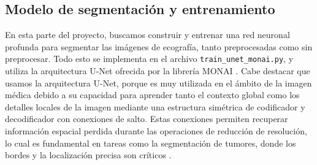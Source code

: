 \documentclass[12pt]{article}
\begin{document}
\subsection{Modelo de segmentación y entrenamiento}
\label{sec:entrenamiento}
En esta parte del proyecto, buscamos construir y entrenar una red neuronal profunda para segmentar las imágenes de ecografía, tanto preprocesadas como sin preprocesar. Todo esto se implementa en el archivo \texttt{train\_unet\_monai.py}, y utiliza la arquitectura U-Net ofrecida por la librería MONAI \cite{monai_unet}.
Cabe destacar que usamos la arquitectura U-Net, porque es muy utilizada en el ámbito de la imagen médica debido a su capacidad para aprender tanto el contexto global como los detalles locales de la imagen mediante una estructura simétrica de codificador y decodificador con conexiones de salto. Estas conexiones permiten recuperar información espacial perdida durante las operaciones de reducción de resolución, lo cual es fundamental en tareas como la segmentación de tumores, donde los bordes y la localización precisa son críticos \cite{damavis_unet}.
\end{document}
